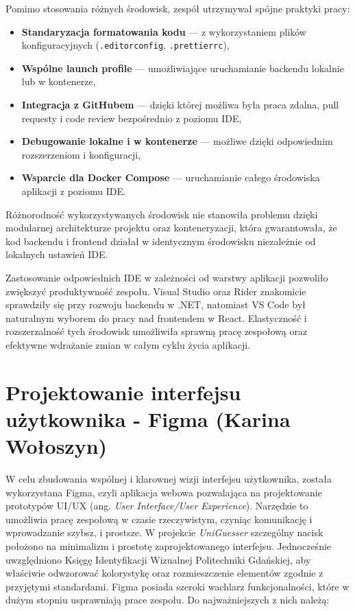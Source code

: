 Pomimo stosowania różnych środowisk, zespół utrzymywał spójne praktyki pracy:

\begin{itemize}
  \item \textbf{Standaryzacja formatowania kodu} --- z wykorzystaniem plików konfiguracyjnych (\texttt{.editorconfig}, \texttt{.prettierrc}),
  \item \textbf{Wspólne launch profile} --- umożliwiające uruchamianie backendu lokalnie lub w kontenerze,
  \item \textbf{Integracja z GitHubem} --- dzięki której możliwa była praca zdalna, pull requesty i code review bezpośrednio z poziomu IDE,
  \item \textbf{Debugowanie lokalne i w kontenerze} --- możliwe dzięki odpowiednim rozszerzeniom i konfiguracji,
  \item \textbf{Wsparcie dla Docker Compose} --- uruchamianie całego środowiska aplikacji z poziomu IDE.
\end{itemize}

Różnorodność wykorzystywanych środowisk nie stanowiła problemu dzięki modularnej architekturze projektu oraz konteneryzacji, która gwarantowała, że kod backendu i frontend działał w identycznym środowisku niezależnie od lokalnych ustawień IDE.

Zastosowanie odpowiednich IDE w zależności od warstwy aplikacji pozwoliło zwiększyć produktywność zespołu. Visual Studio oraz Rider znakomicie sprawdziły się przy rozwoju backendu w .NET, natomiast VS Code był naturalnym wyborem do pracy nad frontendem w React. Elastyczność i rozszerzalność tych środowisk umożliwiła sprawną pracę zespołową oraz efektywne wdrażanie zmian w całym cyklu życia aplikacji.

\section{Projektowanie interfejsu użytkownika - Figma (Karina Wołoszyn)}

W celu zbudowania wspólnej i klarownej wizji interfejsu użytkownika, została wykorzystana Figma, czyli aplikacja webowa pozwalająca na projektowanie prototypów UI/UX (ang. \textit{User Interface/User Experience}). Narzędzie to umożliwia pracę zespołową w czasie rzeczywistym, czyniąc komunikację i wprowadzanie szybsz, i prostsze. W projekcie \textit{UniGuesser} szczególny nacisk położono na minimalizm i prostotę zaprojektowanego interfejsu. Jednocześnie uwzględniono Księgę Identyfikacji Wizualnej Politechniki Gdańskiej, aby właściwie odwzorować kolorystykę oraz rozmieszczenie elementów zgodnie z przyjętymi standardami.
Figma posiada szeroki wachlarz funkcjonalności, które w dużym stopniu usprawniają prace zespołu. Do najważniejszych z nich należą:

